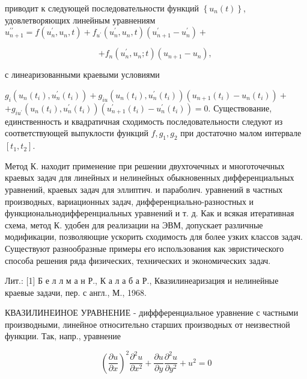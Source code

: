 \documentclass[10pt]{article}
\begin{document}
приводит к следующей последовательности функций $\left\{u_{n}(t)\right\}$, удовлетворяющих линейным уравнениям $u_{n+1}^{\prime \prime}=f\left(u_{n}^{\prime}, u_{n}, t\right)+f_{u^{\prime}}\left(u_{n}^{\prime}, u_{n}, t\right)\left(u_{n+1}^{\prime}-u_{n}^{\prime}\right)+$



\[

+f_{n}\left(u_{n}^{\prime}, u_{n} ; t\right)\left(u_{n+1}-u_{n}\right) \text {, }

\]



с линеаризованными краевыми условиями



$g_{i}\left(u_{n}\left(t_{i}\right), u_{n}^{\prime}\left(t_{i}\right)\right)+g_{i u}\left(u_{n}\left(t_{i}\right), u_{n}^{\prime}\left(t_{i}\right)\right)\left(u_{n+1}\left(t_{i}\right)-u_{n}\left(t_{i}\right)\right)+$ $+g_{i u^{\prime}}\left(u_{n}\left(t_{i}\right), u_{n}^{\prime}\left(t_{i}\right)\right)\left(u_{n+1}^{\prime}\left(t_{i}\right)-u_{n}^{\prime}\left(t_{i}\right)\right)=0$. Существование, единственность и квадратичная сходимость последовательности следуют из соответствующей выпуклости функций $f, g_{1}, g_{2}$ при достаточно малом интервале $\left[t_{1}, t_{2}\right]$.



Метод К. находит применение при решении двухточечных и многоточечных краевых задач для линейных и нелинейных обыкновенных дифференциальных уравнений, краевых задач для эллиптич. и параболич. уравнений в частных производных, вариационных задач, дифференциально-разностных и функциональнодифференциальных уравнений и т. д. Как и всякая итеративная схема, метод К. удобен для реализации на ЭВМ, допускает различные модификации, позволяющие ускорить сходимость для более узких классов задач. Существуют разнообразные примеры его использования как эвристического способа решения ряда физических, технических и экономических задач.



Лит.: [1] Б е л л м а н Р., К а л а б а Р., Квазилинеаризация и нелинейные краевые задачи, пер. с англ., М., 1968.



КВАЗИЛИНЕИНОЕ УРАВНЕНИЕ - диффференциальное уравнение с частными производными, линейное относительно старших производных от неизвестной функции. Так, напр., уравнение



\[

\left(\frac{\partial u}{\partial x}\right)^{2} \frac{\partial^{2} u}{\partial x^{2}}+\frac{\partial u}{\partial y} \frac{\partial^{2} u}{\partial y^{2}}+u^{2}=0

\]
\end{document}
